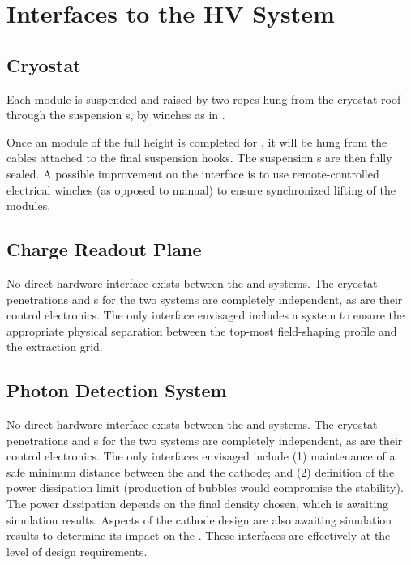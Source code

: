 \section{Interfaces to the HV System}
\label{sec:fddp-hv-intfc}

\subsection{Cryostat}
\label{sec:fddp-hv-intfc-to-cryostat}

Each  module is suspended and raised by two ropes hung from the cryostat roof through the  suspension \fdth{}s, by winches as in .  

Once an  module of the full height is completed for , it will be hung 
from the cables attached to the final suspension hooks. The suspension \fdth{}s are then fully sealed. 
A possible improvement on the  interface is to use remote-controlled electrical winches (as opposed to manual) to ensure synchronized lifting of the modules.

\subsection{Charge Readout Plane}
\label{sec:fddp-hv-intfc-to-crp}

No direct hardware interface exists between the  and  systems. The cryostat penetrations and \fdth{}s for the two systems are completely independent, as are their control electronics. The only interface envisaged includes a system to ensure the appropriate physical separation between the top-most field-shaping profile and the  extraction grid.

\subsection{Photon Detection System}
\label{sec:fddp-hv-intfc-to-pds}


No direct hardware interface exists between the  and  systems. The cryostat penetrations and \fdth{}s for the two systems are completely independent, as are their control electronics. The only interfaces envisaged include (1) maintenance of a safe minimum distance between the  and the \dptargetdriftvoltneg cathode; and (2)
 definition of the  power dissipation limit (production of bubbles would compromise the  stability). The power dissipation depends on the final  density chosen, which is awaiting simulation results. Aspects of the cathode design are also awaiting simulation results to determine its impact on the . 
These interfaces are effectively at the level of design requirements. 


